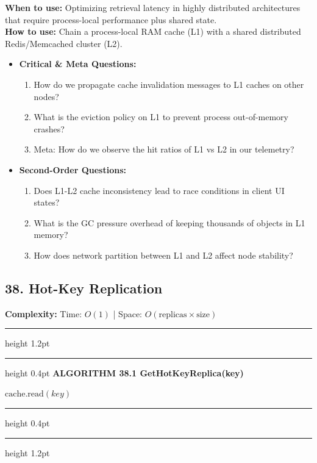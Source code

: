 \documentclass[11pt,a4paper]{article}
\newenvironment{textbookalgo}[2]{%
  \par\addvspace{1.2em}\noindent
  \hrule height 1.2pt
  \vspace{1.5pt}
  \hrule height 0.4pt
  \vspace{5pt}
  {\noindent\large\bfseries\sffamily ALGORITHM #1 \quad #2}
  \par\vspace{5pt}
  \RestyleAlgo{plain}
}{%
  \par\vspace{4pt}
  \hrule height 0.4pt
  \vspace{1.5pt}
  \hrule height 1.2pt
  \par\addvspace{1.2em}
}
\theoremstyle{definition}
\begin{document}
\noindent
\textbf{When to use:} Optimizing retrieval latency in highly distributed architectures that require process-local performance plus shared state.\\
\textbf{How to use:} Chain a process-local RAM cache (L1) with a shared distributed Redis/Memcached cluster (L2).
\begin{itemize}[leftmargin=*]
  \item[] \textbf{Critical \& Meta Questions:}
  \begin{enumerate}
    \item How do we propagate cache invalidation messages to L1 caches on other nodes?
    \item What is the eviction policy on L1 to prevent process out-of-memory crashes?
    \item Meta: How do we observe the hit ratios of L1 vs L2 in our telemetry?
  \end{enumerate}
  \item[] \textbf{Second-Order Questions:}
  \begin{enumerate}
    \item Does L1-L2 cache inconsistency lead to race conditions in client UI states?
    \item What is the GC pressure overhead of keeping thousands of objects in L1 memory?
    \item How does network partition between L1 and L2 affect node stability?
  \end{enumerate}
\end{itemize}
\medskip


\clearpage
\subsection{38. Hot-Key Replication}

\noindent
\textbf{Complexity:} Time: $O(1)$ | Space: $O(\text{replicas} \times \text{size})$
\smallskip

\begin{textbookalgo}{38.1}{GetHotKeyReplica(key)}
\begin{algorithm}[H]
\Return $\text{cache.read}(key)$\;
\end{algorithm}
\end{textbookalgo}
\end{document}
